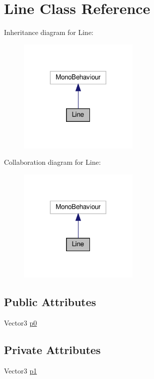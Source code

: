 \hypertarget{classLine}{}\section{Line Class Reference}
\label{classLine}


Inheritance diagram for Line\+:\nopagebreak
\begin{figure}[H]
\begin{center}
\leavevmode
\includegraphics[width=164pt]{classLine__inherit__graph}
\end{center}
\end{figure}


Collaboration diagram for Line\+:\nopagebreak
\begin{figure}[H]
\begin{center}
\leavevmode
\includegraphics[width=164pt]{classLine__coll__graph}
\end{center}
\end{figure}
\subsection*{Public Attributes}
\begin{DoxyCompactItemize}
\item 
Vector3 \hyperlink{classLine_a20d5ecabee2113e42017734b748b485d}{p0}
\end{DoxyCompactItemize}
\subsection*{Private Attributes}
\begin{DoxyCompactItemize}
\item 
Vector3 \hyperlink{classLine_aaecb847629b70b917115e59873531cdb}{p1}
\end{DoxyCompactItemize}


